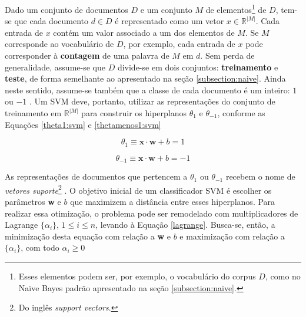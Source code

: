Dado um conjunto de documentos \ensuremath{D} e um conjunto \ensuremath{M} de elementos\footnote{Esses elementos podem ser, por exemplo, o vocabulário do corpus \ensuremath{D}, como no Naïve Bayes padrão apresentado na seção \ref{subsection:naive}.} de \ensuremath{D}, tem-se que cada documento \ensuremath{d \in D} é representado como um vetor \ensuremath{x \in \mathbb{R}^{|M|}}. Cada entrada de \ensuremath{x} contém um valor associado a um dos elementos de \ensuremath{M}. Se \ensuremath{M} corresponde ao vocabulário de \ensuremath{D}, por exemplo, cada entrada de \ensuremath{x} pode corresponder à \textbf{contagem} de uma palavra de \ensuremath{M} em \ensuremath{d}. Sem perda de generalidade, assume-se que \ensuremath{D} divide-se em dois conjuntos: \textbf{treinamento} e \textbf{teste}, de forma semelhante ao apresentado na seção \ref{subsection:naive}. Ainda neste sentido, assume-se também que a classe de cada documento é um inteiro: \ensuremath{1} ou \ensuremath{-1} \cite{mono-puc}. Um SVM deve, portanto, utilizar as representações do conjunto de treinamento em \ensuremath{\mathbb{R}^{|M|}} para construir os hiperplanos \ensuremath{\theta_1} e \ensuremath{\theta_{-1}}, conforme as Equações \ref{theta1:svm} e \ref{thetamenos1:svm} \cite{mono-puc}

\begin{equation}
\label{theta1:svm}
\ensuremath{\theta_1 \equiv } \textbf{x} \ensuremath{\cdot} \textbf{w} + \ensuremath{b} = 1
\end{equation}

\begin{equation}
\label{thetamenos1:svm}
\ensuremath{\theta_{-1} \equiv } \textbf{x} \ensuremath{\cdot} \textbf{w} + \ensuremath{b} = -1
\end{equation}

As representações de documentos que pertencem a \ensuremath{\theta_1} ou \ensuremath{\theta_{-1}} recebem o nome de \emph{vetores suporte}\footnote{Do inglês \emph{support vectors}.} \cite{mono-puc}. O objetivo inicial de um classificador SVM é escolher os parâmetros \textbf{w} e \ensuremath{b} que maximizem a distância entre esses hiperplanos. Para realizar essa otimização, o problema pode ser remodelado com multiplicadores de Lagrange \ensuremath{\{\alpha_i\}}, \ensuremath{1 \leq i \leq n}, levando à Equação \ref{lagrange}. Busca-se, então, a minimização desta equação com relação a \textbf{w} e \ensuremath{b} e maximização com relação a \ensuremath{\{\alpha_i\}}, com todo \ensuremath{\alpha_i \geq 0} \cite{mono-puc}


